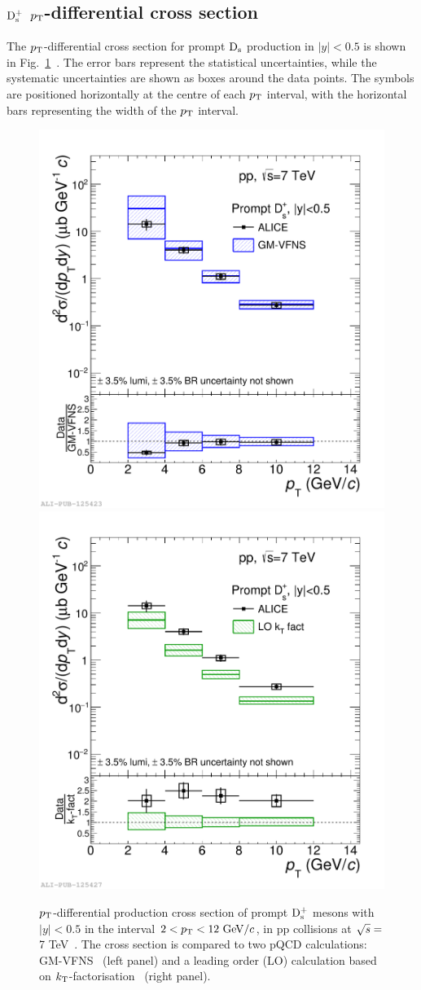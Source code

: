 \subsection{${\rm D_s^+}$ $p_{\rm T}$-differential cross section}
\label{sec:ppCrosSec}
The $p_{\rm T}$-differential cross section for prompt ${\rm D_s}$ 
production in $|y|<0.5$ is shown in  
Fig.~\ref{fig:CrossSecDsvsGMVFNS}~\cite{Acharya:2017jgo}.
The error bars represent the statistical uncertainties, while the systematic 
uncertainties are shown as boxes around the data points. 
The symbols are positioned horizontally at the centre of each $p_{\rm T}$ interval,
with the horizontal bars representing the width of the $p_{\rm T}$ interval. 
\begin{figure}[!b]
\begin{center}
\includegraphics[width=.48\textwidth]{FigCap4/DsppCrossSecVsGMVFNSAndRatio.pdf}
\includegraphics[width=.48\textwidth]{FigCap4/DsppCrossSecVsKtFactAndRatio.pdf}
\caption{$p_{\rm T}$-differential production cross section of prompt ${\rm D_s^+}$ mesons 
with $|y|<0.5$ in the interval \mbox{$2<p_{\rm T}<12~\mathrm{GeV}/c$}, in pp collisions at 
$\sqrt{s}  =$ 7 TeV~\cite{Acharya:2017jgo}. 
The cross section is compared to two pQCD calculations: 
GM-VFNS~\cite{Kniehl:2012ti} (left panel) and a leading order (LO) calculation 
based on $k_{\rm T}$-factorisation~\cite{Maciula:2013wg} (right panel).
}
\label{fig:CrossSecDsvsGMVFNS}
\end{center}
\end{figure}
